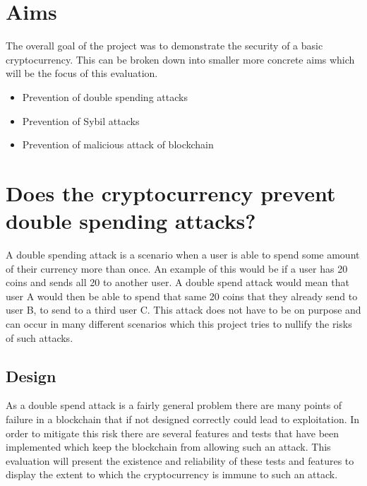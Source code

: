 \documentclass{l4proj}
\begin{document}



\section{Aims}
The overall goal of the project was to demonstrate the security of a basic cryptocurrency. This can be broken down into
smaller more concrete aims which will be the focus of this evaluation.
\begin{itemize}
    \item Prevention of double spending attacks
    \item Prevention of Sybil attacks
    \item Prevention of malicious attack of blockchain
\end{itemize}

\section{Does the cryptocurrency prevent double spending attacks?}
A double spending attack is a scenario when a user is able to spend some amount of their currency more than once. An example
of this would be if a user has 20 coins and sends all 20 to another user. A double spend attack would mean that user A would
then be able to spend that same 20 coins that they already send to user B, to send to a third user C. This attack does not have
to be on purpose and can occur in many different scenarios which this project tries to nullify the risks of such attacks.

\subsection{Design}
As a double spend attack is a fairly general problem there are many points of failure in a blockchain that if not designed
correctly could lead to exploitation. In order to mitigate this risk there are several features and tests that have been
implemented which keep the blockchain from allowing such an attack. This evaluation will present the existence and 
reliability of these tests and features to display the extent to which the cryptocurrency is immune to such an attack.
\end{document}
